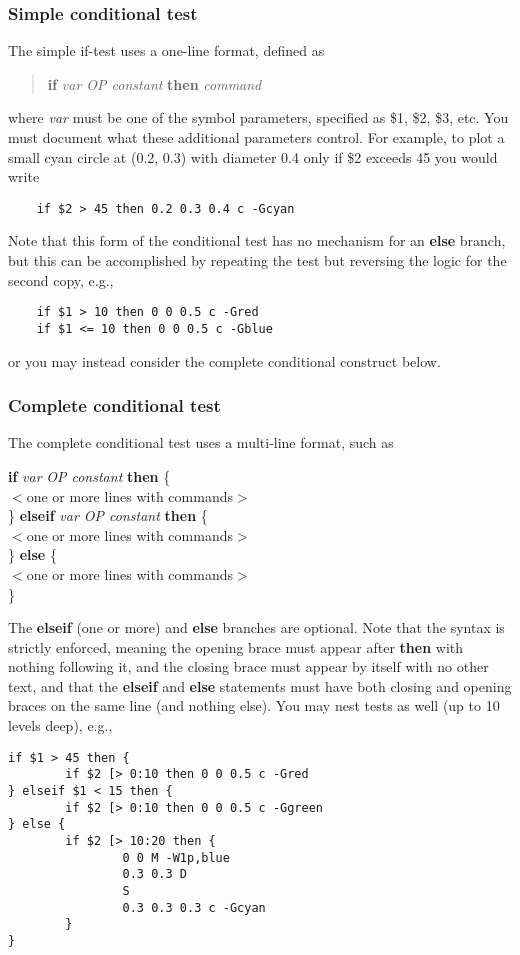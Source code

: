 \subsubsection{Simple conditional test}
The simple if-test uses a one-line format, defined as
\begin{quote}
	{\bf if} \emph{var OP constant} {\bf then}  \emph{command}
\end{quote}
where \emph{var} must be one of the symbol parameters, specified as \$1, \$2, \$3, etc.
You must document what these additional parameters control.  For example, to plot a
small cyan circle at (0.2, 0.3) with diameter 0.4 only if \$2 exceeds 45 you would write
\begin{verbatim}
	if $2 > 45 then 0.2 0.3 0.4 c -Gcyan
\end{verbatim}
Note that this form of the conditional test has no mechanism for an {\bf else} branch, but this can be accomplished
by repeating the test but reversing the logic for the second copy, e.g.,
\begin{verbatim}
	if $1 > 10 then 0 0 0.5 c -Gred
	if $1 <= 10 then 0 0 0.5 c -Gblue
\end{verbatim}
or you may instead consider the complete conditional construct below.
\subsubsection{Complete conditional test}

The complete conditional test uses a multi-line format, such as
\begin{tabbing}
	{\bf if} \emph{var} \= \emph{OP constant} {\bf then}  \{ \\
	\> $<$one or more lines with commands$>$ \\
	\} {\bf elseif} \emph{var OP constant} {\bf then}  \{ \\
	\> $<$one or more lines with commands$>$ \\
	\} {\bf else} \{ \\
	\> $<$one or more lines with commands$>$ \\
	\}
\end{tabbing}
The {\bf elseif} (one or more) and {\bf else} branches are optional.  Note that the syntax is strictly enforced,
meaning the opening brace must appear after {\bf then} with nothing following it, and the closing brace
must appear by itself with no other text, and that the {\bf elseif} and {\bf else} statements must have both closing
and opening braces on the same line (and nothing else).  You may nest tests as well (up to 10 levels deep), e.g.,
\begin{verbatim}
if $1 > 45 then {
        if $2 [> 0:10 then 0 0 0.5 c -Gred
} elseif $1 < 15 then {
        if $2 [> 0:10 then 0 0 0.5 c -Ggreen
} else {
        if $2 [> 10:20 then {
                0 0 M -W1p,blue
                0.3 0.3 D
                S
                0.3 0.3 0.3 c -Gcyan
        }
}
\end{verbatim}


